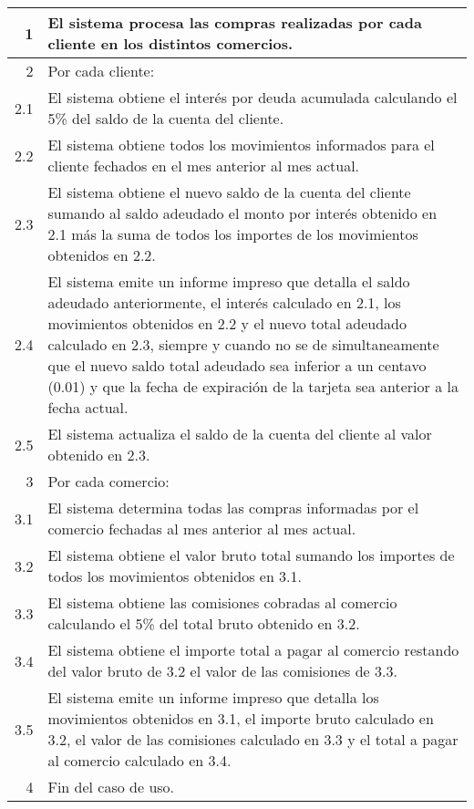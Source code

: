 \begin{tabularx}{\textwidth}{| r | X |}
\hline
1 & El sistema procesa las compras realizadas por cada cliente en los distintos
comercios. \\
\hline
2 & Por cada cliente: \\
\hline
2.1 & El sistema obtiene el interés por deuda acumulada calculando el 5\% del
saldo de la cuenta del cliente. \\
\hline
2.2 & El sistema obtiene todos los movimientos informados para el cliente
fechados en el mes anterior al mes actual. \\
\hline
2.3 & El sistema obtiene el nuevo saldo de la cuenta del cliente sumando al
saldo adeudado el monto por interés obtenido en 2.1 más la suma de todos los
importes de los movimientos obtenidos en 2.2. \\
\hline
2.4 & El sistema emite un informe impreso que detalla el saldo adeudado
anteriormente, el interés calculado en 2.1, los movimientos obtenidos en 2.2 y
el nuevo total adeudado calculado en 2.3, siempre y cuando no se de
simultaneamente que el nuevo saldo total adeudado sea inferior a un centavo
(0.01) y que la fecha de expiración de la tarjeta sea anterior a la fecha
actual.\\
\hline
2.5 & El sistema actualiza el saldo de la cuenta del cliente al valor obtenido en 2.3. \\
\hline
3 & Por cada comercio: \\
\hline
3.1 & El sistema determina todas las compras informadas por el comercio
fechadas al mes anterior al mes actual. \\
\hline
3.2 & El sistema obtiene el valor bruto total sumando los importes de todos los
movimientos obtenidos en 3.1. \\
\hline
3.3 & El sistema obtiene las comisiones cobradas al comercio calculando el 5\%
del total bruto obtenido en 3.2. \\
\hline
3.4 & El sistema obtiene el importe total a pagar al comercio restando del
valor bruto de 3.2 el valor de las comisiones de 3.3. \\
\hline
3.5 & El sistema emite un informe impreso que detalla los movimientos obtenidos
en 3.1, el importe bruto calculado en 3.2, el valor de las comisiones calculado
en 3.3 y el total a pagar al comercio calculado en 3.4. \\
\hline
4 & Fin del caso de uso. \\

\hline
\end{tabularx}


